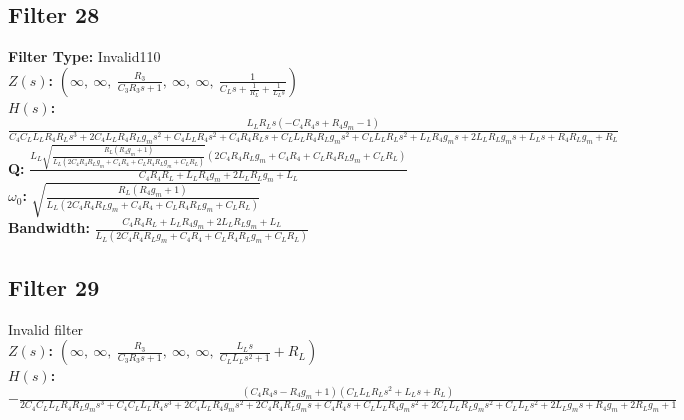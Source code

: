 \documentclass{article}
\begin{document}
\subsection*{Filter 28}
\textbf{Filter Type:} Invalid110 \\ 
\textbf{$Z(s)$:} $\left( \infty, \  \infty, \  \frac{R_{3}}{C_{3} R_{3} s + 1}, \  \infty, \  \infty, \  \frac{1}{C_{L} s + \frac{1}{R_{L}} + \frac{1}{L_{L} s}}\right)$ \\ 
\textbf{$H(s)$:} $\frac{L_{L} R_{L} s \left(- C_{4} R_{4} s + R_{4} g_{m} - 1\right)}{C_{4} C_{L} L_{L} R_{4} R_{L} s^{3} + 2 C_{4} L_{L} R_{4} R_{L} g_{m} s^{2} + C_{4} L_{L} R_{4} s^{2} + C_{4} R_{4} R_{L} s + C_{L} L_{L} R_{4} R_{L} g_{m} s^{2} + C_{L} L_{L} R_{L} s^{2} + L_{L} R_{4} g_{m} s + 2 L_{L} R_{L} g_{m} s + L_{L} s + R_{4} R_{L} g_{m} + R_{L}}$ \\ 
\textbf{Q:} $\frac{L_{L} \sqrt{\frac{R_{L} \left(R_{4} g_{m} + 1\right)}{L_{L} \left(2 C_{4} R_{4} R_{L} g_{m} + C_{4} R_{4} + C_{L} R_{4} R_{L} g_{m} + C_{L} R_{L}\right)}} \left(2 C_{4} R_{4} R_{L} g_{m} + C_{4} R_{4} + C_{L} R_{4} R_{L} g_{m} + C_{L} R_{L}\right)}{C_{4} R_{4} R_{L} + L_{L} R_{4} g_{m} + 2 L_{L} R_{L} g_{m} + L_{L}}$ \\ 
\textbf{$\omega_0$:} $\sqrt{\frac{R_{L} \left(R_{4} g_{m} + 1\right)}{L_{L} \left(2 C_{4} R_{4} R_{L} g_{m} + C_{4} R_{4} + C_{L} R_{4} R_{L} g_{m} + C_{L} R_{L}\right)}}$ \\ 
\textbf{Bandwidth:} $\frac{C_{4} R_{4} R_{L} + L_{L} R_{4} g_{m} + 2 L_{L} R_{L} g_{m} + L_{L}}{L_{L} \left(2 C_{4} R_{4} R_{L} g_{m} + C_{4} R_{4} + C_{L} R_{4} R_{L} g_{m} + C_{L} R_{L}\right)}$ \\ 
\subsection*{Filter 29}
Invalid filter \\ 
\textbf{$Z(s)$:} $\left( \infty, \  \infty, \  \frac{R_{3}}{C_{3} R_{3} s + 1}, \  \infty, \  \infty, \  \frac{L_{L} s}{C_{L} L_{L} s^{2} + 1} + R_{L}\right)$ \\ 
\textbf{$H(s)$:} $- \frac{\left(C_{4} R_{4} s - R_{4} g_{m} + 1\right) \left(C_{L} L_{L} R_{L} s^{2} + L_{L} s + R_{L}\right)}{2 C_{4} C_{L} L_{L} R_{4} R_{L} g_{m} s^{3} + C_{4} C_{L} L_{L} R_{4} s^{3} + 2 C_{4} L_{L} R_{4} g_{m} s^{2} + 2 C_{4} R_{4} R_{L} g_{m} s + C_{4} R_{4} s + C_{L} L_{L} R_{4} g_{m} s^{2} + 2 C_{L} L_{L} R_{L} g_{m} s^{2} + C_{L} L_{L} s^{2} + 2 L_{L} g_{m} s + R_{4} g_{m} + 2 R_{L} g_{m} + 1}$ \\ 
\end{document}
